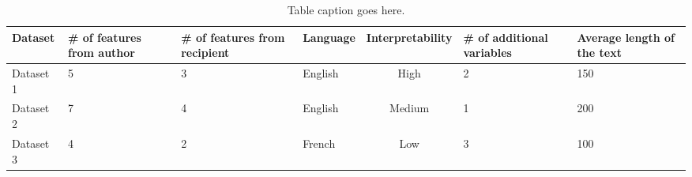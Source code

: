 \documentclass[12pt]{article}
\begin{document}
\begin{table}[h]
    \centering
    \small
    \begin{tabular}{|p{2cm}|p{2cm}|p{2cm}|p{2cm}|c|p{2cm}|p{2cm}|}
    \hline
    Dataset & \# of features from author & \# of features from recipient & Language & \parbox{3cm}{Interpretability} & \# of additional variables & Average length of the text \\
    \hline
    Dataset 1 & 5 & 3 & English & High & 2 & 150 \\
    \hline
    Dataset 2 & 7 & 4 & English & Medium & 1 & 200 \\
    \hline
    Dataset 3 & 4 & 2 & French & Low & 3 & 100 \\
    \hline
    \end{tabular}
    \caption{Table caption goes here.}
    \label{tab:mytable}
\end{table}
\end{document}
